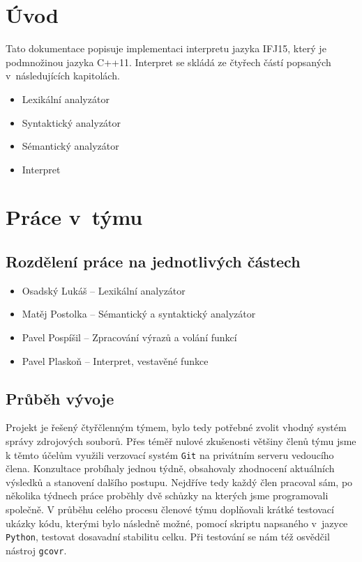 \documentclass[a4paper, 12pt]{article}
\begin{document}
\tableofcontents
\newpage
\section{Úvod} \label{uvod}

Tato dokumentace popisuje implementaci interpretu jazyka IFJ15, který je
podmnožinou jazyka C++11. Interpret se skládá ze čtyřech částí
popsaných v~následujících kapitolách.

\begin{itemize}
	\item Lexikální analyzátor
	\item Syntaktický analyzátor
	\item Sémantický analyzátor
	\item Interpret
\end{itemize}
\section{Práce v~týmu} \label{team}

\subsection{Rozdělení práce na jednotlivých částech}
\begin{itemize}
	\item Osadský Lukáš -- Lexikální analyzátor
	\item Matěj Postolka -- Sémantický a syntaktický analyzátor
	\item Pavel Pospíšil -- Zpracování výrazů a volání funkcí
	\item Pavel Plaskoň -- Interpret, vestavěné funkce
\end{itemize}

\subsection{Průběh vývoje}
Projekt je řešený čtyřčlenným týmem, bylo tedy potřebné zvolit vhodný systém
správy zdrojových souborů. Přes téměř nulové zkušenosti většiny členů týmu jsme
k těmto účelům využili verzovací systém \texttt{Git} na privátním serveru
vedoucího člena.
Konzultace probíhaly jednou týdně, obsahovaly zhodnocení aktuálních výsledků
a stanovení dalšího postupu. Nejdříve tedy každý člen pracoval sám, po několika
týdnech práce proběhly dvě schůzky na kterých jsme programovali společně.
V průběhu celého procesu členové týmu doplňovali krátké testovací ukázky kódu,
kterými bylo následně možné, pomocí skriptu napsaného v~jazyce \texttt{Python},
testovat dosavadní stabilitu celku. Při testování se nám též osvědčil nástroj
\texttt{gcovr}.
\end{document}
